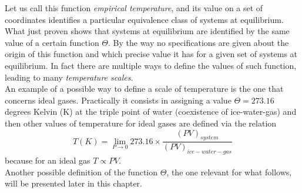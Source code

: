 Let us call this function \emph{empirical temperature}, and its value on a set of coordinates identifies a particular equivalence class of systems at equilibrium. \\
What just proven shows that systems at equilibrium are identified by the same value of a certain function $\Theta$. By the way no specifications are given about the origin 
of this function and which precise value it has for a given set of systems at equilibrium. In fact there are multiple ways to define the values of such function, leading
to many \emph{temperature scales}. \\
An example of a possible way to define a scale of temperature is the one that concerns ideal gases. Practically it consists in assigning a value $\Theta = 273.16$ degrees Kelvin (K) at the triple point of water (coexistence of ice-water-gas) and then
other values of temperature for ideal gases are defined via the relation 
\begin{equation*}
    T(K) = \lim_{P \to 0} 273.16 \times \frac{(PV)_{system}}{(PV)_{ice-water-gas}}
\end{equation*}
because for an ideal gas $T \propto PV$. \\
Another possible definition of the function $\Theta$, the one relevant for what follows, will be presented later in this chapter.

